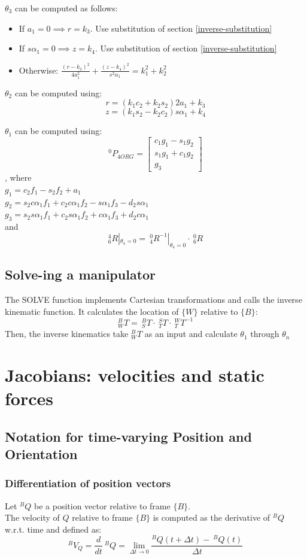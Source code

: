 \documentclass[10pt,a4paper]{article}
\newcommand{\vect}[1]{\ensuremath{\begin{bmatrix}#1\end{bmatrix}}}
\begin{document}
$\theta_3$ can be computed as follows:
\begin{itemize}
	\item If $a_1 = 0 \implies r = k_3$. Use substitution of section \ref{inverse-substitution}
	\item If $s\alpha_1 = 0 \implies z = k_4$. Use substitution of section \ref{inverse-substitution}
	\item Otherwise: $\frac{(r - k_3)^2}{4a_1^2} + \frac{(z - k_4)^2}{s^2\alpha_1} = k_1^2 + k_2^2$
\end{itemize}

$\theta_2$ can be computed using: \\
$$
r = (k_1c_2 + k_2s_2)2a_1 + k_3
$$
$$
z = (k_1s_2 - k_2c_2)s\alpha_1 + k_4
$$

$\theta_1$ can be computed using: \\
$$
	^0P_{4ORG} = \vect{c_1g_1 - s_1g_2 \\ s_1g_1 + c_1g_2 \\ g_3}
$$, where \\
$g_1 = c_2f_1 - s_2f_2 + a_1$ \\
$g_2 = s_2c\alpha_1f_1 + c_2c\alpha_1f_2 - s\alpha_1f_3 - d_2s\alpha_1$ \\
$g_3 = s_2s\alpha_1f_1 + c_2s\alpha_1f_2 + c\alpha_1f_3 + d_2c\alpha_1$ \\
and 
$$
	^4_6R|_{\theta_4 = 0} = ~^0_4R^{-1}|_{\theta_4 = 0} ⋅ ~^0_6R
$$

\subsection{Solve-ing a manipulator}
The SOLVE function implements Cartesian transformations and calls the inverse kinematic function. It calculates the location of $\{W\}$ relative to $\{B\}$: \\
$$
	^B_WT = ~^B_ST ⋅ ~^S_TT ⋅ ~^W_TT^{-1}
$$
Then, the inverse kinematics take $^B_WT$ as an input and calculate $\theta_1$ through $\theta_n$

\section{Jacobians: velocities and static forces}
\subsection{Notation for time-varying Position and Orientation}
\subsubsection{Differentiation of position vectors}
Let $^BQ$ be a position vector relative to frame $\{B\}$. \\
The velocity of $Q$ relative to frame $\{B\}$ is computed as the derivative of $^BQ$ w.r.t. time and defined as:
$$
	^BV_Q = \frac{d}{dt} ~^BQ = \lim_{\Delta t → 0} \frac{^BQ(t + \Delta t) - ~^BQ(t)}{\Delta t}
$$
\end{document}
